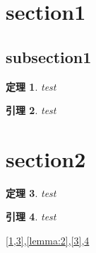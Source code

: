 \documentclass[12pt]{ctexart}
\newtheorem{theorem}{定理}
\newtheorem{lemma}[theorem]{引理}
\begin{document}
\section{section1}
\subsection{subsection1}
\begin{theorem}\label{1}
    test
\end{theorem}
\begin{lemma}\label{lemma:2}
    test
\end{lemma}

\section{section2}
\begin{theorem}\label{3}
    test
\end{theorem}
\begin{lemma}\label{4}
    test
\end{lemma}
\cref{1,3},\autoref{lemma:2},\autoref{3},\cref{4}
\end{document}
